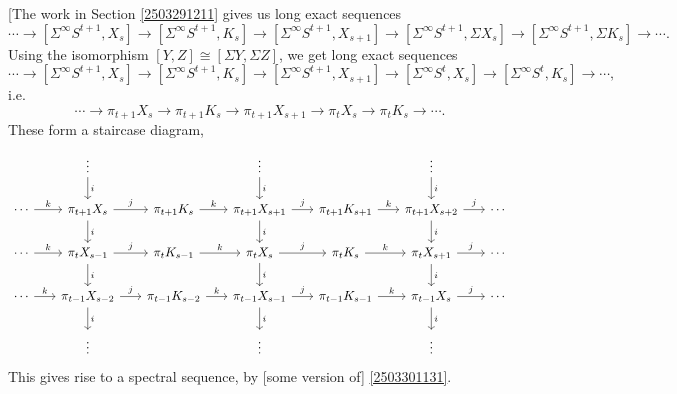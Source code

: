 \documentclass{MetricNotes2023}
\begin{document}
[The work in Section \ref{2503291211} gives us long exact sequences
\[\cdots \to [\Sigma^\infty S^{t+1}, X_s] \to [\Sigma^\infty S^{t+1}, K_s] \to [\Sigma^\infty S^{t+1}, X_{s+1}]\to [\Sigma^{\infty}S^{t+1}, \Sigma X_s]\to [\Sigma^{\infty}S^{t+1}, \Sigma K_s] \to \cdots.\]
Using the isomorphism \([Y,Z]\cong [\Sigma Y, \Sigma Z]\), we get long exact sequences
\[\cdots \to [\Sigma^\infty S^{t+1}, X_s] \to [\Sigma^\infty S^{t+1}, K_s] \to [\Sigma^\infty S^{t+1}, X_{s+1}]\to [\Sigma^{\infty}S^{t}, X_s]\to [\Sigma^{\infty}S^{t}, K_s] \to \cdots,\]
i.e.
\[\cdots \to \pi_{t+1}X_s \to \pi_{t+1}K_s \to \pi_{t+1}X_{s+1}\to \pi_t X_s\to \pi_t K_s \to \cdots.\]
These form a staircase diagram,
\[\begin{tikzcd}[column sep=4ex]
   &  \vdots \arrow[d, "i"] &  & \vdots \arrow[d, "i"] &  & \vdots \arrow[d, "i"] & \\
 \cdots \arrow[r, "k"] & \pi_{t+1}X_s \arrow[d, "i"] \arrow[r, "j"] & \pi_{t+1}K_s  \arrow[r, "k"] & \pi_{t+1}X_{s+1} \arrow[d, "i"] \arrow[r, "j"] & \pi_{t+1}K_{s+1} \arrow[r, "k"] & \pi_{t+1}X_{s+2} \arrow[d, "i"] \arrow[r, "j"] & \cdots \\
 \cdots \arrow[r, "k"] & \pi_t X_{s-1} \arrow[d, "i"] \arrow[r, "j"] & \pi_t K_{s-1}  \arrow[r, "k"] & \pi_t X_s \arrow[d, "i"] \arrow[r, "j"] & \pi_t K_s \arrow[r, "k"] & \pi_t X_{s+1} \arrow[d, "i"] \arrow[r, "j"] & \cdots \\
 \cdots \arrow[r, "k"] & \pi_{t-1}X_{s-2}  \arrow[d, "i"] \arrow[r, "j"] & \pi_{t-1}K_{s-2}  \arrow[r, "k"] & \pi_{t-1}X_{s-1} \arrow[d, "i"] \arrow[r, "j"] & \pi_{t-1}K_{s-1} \arrow[r, "k"] & \pi_{t-1}X_s \arrow[d, "i"] \arrow[r, "j"] & \cdots \\
 & \vdots &  & \vdots & & \vdots &
\end{tikzcd}\]
This gives rise to a spectral sequence, by [some version of] \ref{2503301131}.
\end{document}
